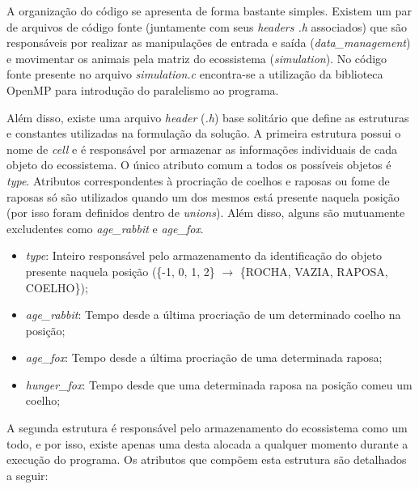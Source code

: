 \documentclass[a4paper, 12pt]{article}
\begin{document}
A organização do código se apresenta de forma bastante simples. Existem um par de arquivos de código fonte (juntamente com seus \emph{headers .h} associados) que são responsáveis por realizar as manipulações de entrada e saída (\emph{data\_management}) e movimentar os animais pela matriz do ecossistema (\emph{simulation}). No código fonte presente no arquivo \emph{simulation.c} encontra-se a utilização da biblioteca OpenMP para introdução do paralelismo ao programa.

Além disso, existe uma arquivo \emph{header} (\emph{.h}) base solitário que define as estruturas e constantes utilizadas na formulação da solução. A primeira estrutura possui o nome de \emph{cell} e é responsável por armazenar as informações individuais de cada objeto do ecossistema. O único atributo comum a todos os possíveis objetos é \emph{type}. Atributos correspondentes à procriação de coelhos e raposas ou fome de raposas só são utilizados quando um dos mesmos está presente naquela posição (por isso foram definidos dentro de \emph{unions}). Além disso, alguns são mutuamente excludentes como \emph{age\_rabbit} e \emph{age\_fox}.

\begin{itemize}
    \item \emph{type}: Inteiro responsável pelo armazenamento da identificação do objeto presente naquela posição (\{-1, 0, 1, 2\} \(\rightarrow\) \{ROCHA, VAZIA, RAPOSA, COELHO\});
    \item \emph{age\_rabbit}: Tempo desde a última procriação de um determinado coelho na posição;
    \item \emph{age\_fox}: Tempo desde a última procriação de uma determinada raposa;
    \item \emph{hunger\_fox}: Tempo desde que uma determinada raposa na posição comeu um coelho;
\end{itemize}

A segunda estrutura é responsável pelo armazenamento do ecossistema como um todo, e por isso, existe apenas uma desta alocada a qualquer momento durante a execução do programa. Os atributos que compõem esta estrutura são detalhados a seguir:
\end{document}
